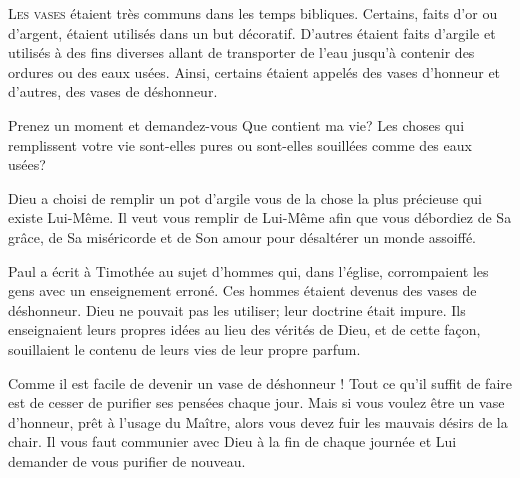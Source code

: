 



\lettrine{L}{es vases} étaient très communs dans les temps bibliques.
 Certains, faits d'or ou d'argent, étaient utilisés dans un but décoratif.
 D'autres étaient faits d'argile et utilisés à des fins diverses
 allant de transporter de l'eau jusqu'à contenir des ordures
 ou des eaux usées. Ainsi, certains étaient appelés des vases d'honneur
 et d'autres, des vases de déshonneur.

Prenez un moment et demandez-vous\frcolon {}
 \Og Que contient ma vie? \Fg {}
 Les choses qui remplissent votre vie sont-elles
 pures ou sont-elles souillées comme des eaux usées? 


Dieu a choisi de remplir un pot d'argile \ocadr vous \fcadr{}
 de la chose la plus précieuse qui existe \ocadr Lui-Même.
 Il veut vous remplir de Lui-Même afin que vous débordiez de Sa grâce,
 de Sa miséricorde et de Son amour pour désaltérer un monde assoiffé.

Paul a écrit à Timothée au sujet d'hommes qui, dans l'église,
 corrompaient les gens avec un enseignement erroné.
 Ces hommes étaient devenus des vases de déshonneur.
 Dieu ne pouvait pas les utiliser; leur doctrine était impure.
 Ils enseignaient leurs propres idées au lieu des vérités de Dieu,
 et de cette fa\c{c}on, souillaient le contenu de leurs vies
 de leur propre parfum. 

Comme il est facile de devenir un vase de déshonneur !
 Tout ce qu'il suffit de faire est de cesser de purifier ses pensées
 chaque jour. Mais si vous voulez être un vase d'honneur,
 prêt à l'usage du Maître, alors vous devez fuir les mauvais désirs
 de la chair. Il vous faut communier avec Dieu à la fin de chaque journée
 et Lui demander de vous purifier de nouveau. 

\dvrule



